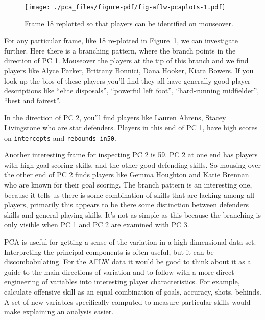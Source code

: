 \documentclass[
  letterpaper,
]{book}
\begin{document}
\begin{figure}[H]

{\centering \texttt{[image: ./pca\_files/figure-pdf/fig-aflw-pcaplots-1.pdf]}

}

\caption{\label{fig-aflw-pcaplots}Frame 18 replotted so that players can
be identified on mouseover.}

\end{figure}

For any particular frame, like 18 re-plotted in
Figure~\ref{fig-aflw-pcaplots}, we can investigate further. Here there
is a branching pattern, where the branch points in the direction of PC
1. Mouseover the players at the tip of this branch and we find players
like Alyce Parker, Brittany Bonnici, Dana Hooker, Kiara Bowers. If you
look up the bios of these players you'll find they all have generally
good player descriptions like ``elite disposals'', ``powerful left
foot'', ``hard-running midfielder'', ``best and fairest''.

In the direction of PC 2, you'll find players like Lauren Ahrens, Stacey
Livingstone who are star defenders. Players in this end of PC 1, have
high scores on \texttt{intercepts} and \texttt{rebounds\_in50}.

Another interesting frame for inspecting PC 2 is 59. PC 2 at one end has
players with high goal scoring skills, and the other good defending
skills. So mousing over the other end of PC 2 finds players like Gemma
Houghton and Katie Brennan who are known for their goal scoring. The
branch pattern is an interesting one, because it tells us there is some
combination of skills that are lacking among all players, primarily this
appears to be there some distinction between defenders skills and
general playing skills. It's not as simple as this because the branching
is only visible when PC 1 and PC 2 are examined with PC 3.

PCA is useful for getting a sense of the variation in a high-dimensional
data set. Interpreting the principal components is often useful, but it
can be discombobulating. For the AFLW data it would be good to think
about it as a guide to the main directions of variation and to follow
with a more direct engineering of variables into interesting player
characteristics. For example, calculate offensive skill as an equal
combination of goals, accuracy, shots, behinds. A set of new variables
specifically computed to measure particular skills would make explaining
an analysis easier.
\end{document}
